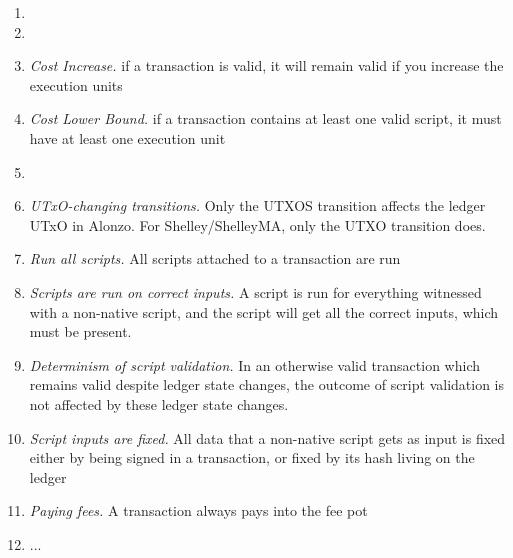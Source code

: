 \begin{enumerate}[label=P{\arabic*}:\ ]
\item
\item
\item
  \emph{Cost Increase.} if a transaction is valid, it will remain valid if you increase the execution units
\item
  \emph{Cost Lower Bound.} if a transaction contains at least one valid script, it must have at least one execution unit
\item
\item \emph{UTxO-changing transitions.} Only the UTXOS transition affects the ledger UTxO in Alonzo.
For Shelley/ShelleyMA, only the UTXO transition does.
\item \emph{Run all scripts.} All scripts attached to a transaction are run
\item \emph{Scripts are run on correct inputs.}
  A script is run for everything witnessed with a non-native script, and the script will
get all the correct inputs, which must be present.
\item \emph{Determinism of script validation.} In an otherwise valid transaction which remains valid
  despite ledger state changes, the outcome
  of script validation is not affected by these ledger state changes.
\item \emph{Script inputs are fixed.} All data that a non-native script gets as input
is fixed either by being signed in a transaction, or fixed by its hash living on the ledger
\item \emph{Paying fees.} A transaction always pays into the fee pot
\item
  ... 
\end{enumerate}

